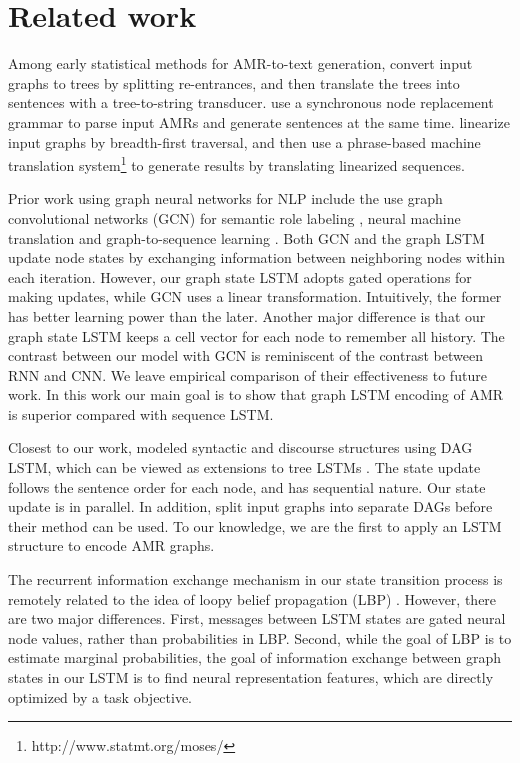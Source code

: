 \documentclass[11pt,a4paper]{article}
\begin{document}
\section{Related work}


Among early statistical methods for AMR-to-text generation,  convert input graphs to trees by splitting re-entrances, and then translate the trees into sentences 
with a tree-to-string transducer.
 use a synchronous node replacement grammar to parse input AMRs and generate sentences at the same time.
 linearize input graphs by breadth-first traversal, and then use a phrase-based machine translation system\footnote{http://www.statmt.org/moses/} to generate results by translating linearized sequences.


Prior work using graph neural networks for NLP include the use graph convolutional networks (GCN) \cite{kipf2017semi} for semantic role labeling \cite{marcheggiani-titov:2017:EMNLP2017}, neural machine translation \cite{bastings-EtAl:2017:EMNLP2017} and graph-to-sequence learning \cite{xu2018graph2seq}. 
Both GCN and the graph LSTM update node states by exchanging information between neighboring nodes within each iteration. 
However, our graph state LSTM adopts gated operations for making updates, while GCN uses a linear transformation.
Intuitively, the former has better learning power than the later.
Another major difference is that our graph state LSTM keeps a cell vector for each node to remember all history.
The contrast between our model with GCN is reminiscent of the contrast between RNN and CNN. We leave empirical comparison of their effectiveness to future work. 
In this work our main goal is to show that graph LSTM encoding of AMR is superior compared with sequence LSTM.


Closest to our work,  modeled syntactic and discourse structures using DAG LSTM, which can be viewed as extensions to tree LSTMs \cite{tai-socher-manning:2015:ACL-IJCNLP}.
The state update follows the sentence order for each node, and has sequential nature.
Our state update is in parallel.
In addition,  split input graphs into separate DAGs before their method can be used. 
To our knowledge, we are the first to apply an LSTM structure to encode AMR graphs. 


The recurrent information exchange mechanism in our state transition process is remotely related to the idea of loopy belief propagation (LBP) \cite{murphy1999loopy}. 
However, there are two major differences. 
First, messages between LSTM states are gated neural node values, rather than probabilities in LBP\@. 
Second, while the goal of LBP is to estimate marginal probabilities, the goal of information exchange between graph states in our LSTM is to find neural representation features, which are directly optimized by a task objective. 
\end{document}
